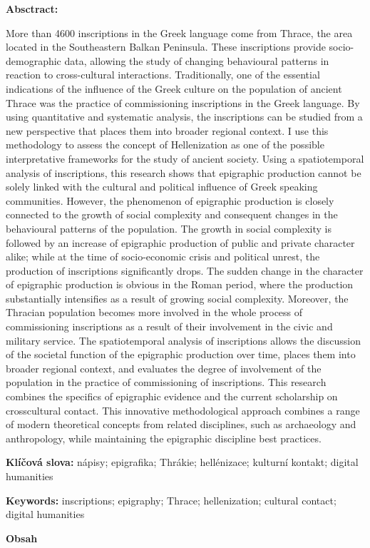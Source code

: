 {\bf Absctract:}

More than 4600 inscriptions in the Greek language come from Thrace, the area located in the Southeastern Balkan Peninsula. These inscriptions provide socio-demographic data, allowing the study of changing behavioural patterns in reaction to cross-cultural interactions. Traditionally, one of the essential indications of the influence of the Greek culture on the population of ancient Thrace was the practice of commissioning inscriptions in the Greek language. By using quantitative and systematic analysis, the inscriptions can be studied from a new perspective that places them into broader regional context. I use this methodology to assess the concept of Hellenization as one of the possible interpretative frameworks for the study of ancient society. Using a spatiotemporal analysis of inscriptions, this research shows that epigraphic production cannot be solely linked with the cultural and political influence of Greek speaking communities. However, the phenomenon of epigraphic production is closely connected to the growth of social complexity and consequent changes in the behavioural patterns of the population. The growth in social complexity is followed by an increase of epigraphic production of public and private character alike; while at the time of socio-economic crisis and political unrest, the production of inscriptions significantly drops. The sudden change in the character of epigraphic production is obvious in the Roman period, where the production substantially intensifies as a result of growing social complexity. Moreover, the Thracian population becomes more involved in the whole process of commissioning inscriptions as a result of their involvement in the civic and military service. The spatiotemporal analysis of inscriptions allows the discussion of the societal function of the epigraphic production over time, places them into broader regional context, and evaluates the degree of involvement of the population in the practice of commissioning of inscriptions. This research combines the specifics of epigraphic evidence and the current scholarship on crosscultural contact. This innovative methodological approach combines a range of modern theoretical concepts from related disciplines, such as archaeology and anthropology, while maintaining the epigraphic discipline best practices.

{\bf Klíčová slova:} nápisy; epigrafika; Thrákie; hellénizace; kulturní kontakt; digital humanities

{\bf Keywords:} inscriptions; epigraphy; Thrace; hellenization; cultural contact; digital humanities

{\bf Obsah}

\stopcomponent